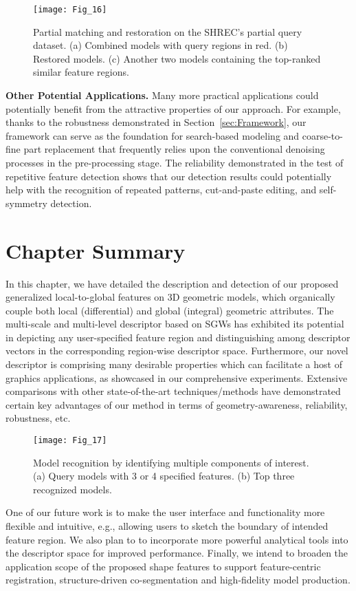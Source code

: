 \begin{figure}[!to]
\texttt{[image: Fig\_16]}
\caption[Partial shape matching and restoration.]
 {Partial matching and restoration on the SHREC's partial query
  dataset. (a) Combined models with query regions in red. (b) Restored
  models.  (c) Another two models containing the top-ranked similar
  feature regions.}
\label{partial-query}
\end{figure}

\textbf{Other Potential Applications.} Many more practical applications
could potentially benefit from the attractive properties of our
approach. For example, thanks to the robustness demonstrated in
Section~\ref{sec:Framework}, our framework can serve as the foundation
for search-based modeling and coarse-to-fine part replacement that
frequently relies upon the conventional denoising processes in the
pre-processing stage. The reliability demonstrated in the test of
repetitive feature detection shows that our detection results could
potentially help with the recognition of repeated patterns,
cut-and-paste editing, and self-symmetry detection.

\section{Chapter Summary}
\label{sec:feature:sum}

In this chapter, we have detailed the description and detection of our
proposed generalized local-to-global features on 3D geometric models,
which organically couple both local (differential) and global
(integral) geometric attributes. The multi-scale and multi-level
descriptor based on SGWs has exhibited its potential in depicting any
user-specified feature region and distinguishing among descriptor
vectors in the corresponding region-wise descriptor space.
Furthermore, our novel descriptor is comprising many desirable
properties which can facilitate a host of graphics applications, as
showcased in our comprehensive experiments. Extensive comparisons with
other state-of-the-art techniques/methods have demonstrated certain
key advantages of our method in terms of geometry-awareness,
reliability, robustness, etc.

\begin{figure}[!to]
\begin{center}
\texttt{[image: Fig\_17]}
\end{center}
\caption[Model recognition by identifying multiple components.]
 {Model recognition by identifying multiple components of
 interest. (a) Query models with 3 or 4 specified features.
  (b) Top three recognized models.}
\label{recognition}
\end{figure}

One of our future work is to make the user interface and functionality
more flexible and intuitive, e.g., allowing users to sketch the boundary of
intended feature region. We also plan to to incorporate more powerful
analytical tools into the descriptor space for improved performance.
Finally, we intend to broaden the application scope of the proposed shape features
to support feature-centric registration, structure-driven co-segmentation
and high-fidelity model production. 